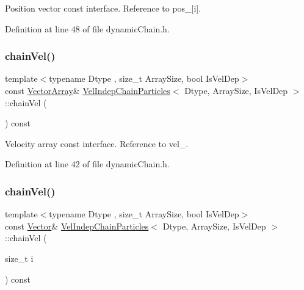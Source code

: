 Position vector const interface. Reference to pos\+\_\+\mbox{[}i\mbox{]}. 



Definition at line 48 of file dynamic\+Chain.\+h.

\mbox{\label{class_vel_indep_chain_particles_a22672cce6930aec1555f1f0662d0f52a}} 
\subsubsection{\texorpdfstring{chain\+Vel()}{chainVel()}\hspace{0.1cm}{\footnotesize\ttfamily [1/2]}}
{\footnotesize\ttfamily template$<$typename Dtype , size\+\_\+t Array\+Size, bool Is\+Vel\+Dep$>$ \\
const \mbox{\hyperlink{class_vel_indep_particles_a27580f65b6523bfb6900520af2e44708}{Vector\+Array}}\& \mbox{\hyperlink{class_vel_indep_chain_particles}{Vel\+Indep\+Chain\+Particles}}$<$ Dtype, Array\+Size, Is\+Vel\+Dep $>$\+::chain\+Vel (\begin{DoxyParamCaption}{ }\end{DoxyParamCaption}) const\hspace{0.3cm}{\ttfamily [inline]}}



Velocity array const interface. Reference to vel\+\_\+. 



Definition at line 42 of file dynamic\+Chain.\+h.

\mbox{\label{class_vel_indep_chain_particles_a81b2a3bd3f972dd11486beaafa6efc72}} 
\subsubsection{\texorpdfstring{chain\+Vel()}{chainVel()}\hspace{0.1cm}{\footnotesize\ttfamily [2/2]}}
{\footnotesize\ttfamily template$<$typename Dtype , size\+\_\+t Array\+Size, bool Is\+Vel\+Dep$>$ \\
const \mbox{\hyperlink{class_vel_indep_particles_aa7e03da81f44941c06abf43ec2180079}{Vector}}\& \mbox{\hyperlink{class_vel_indep_chain_particles}{Vel\+Indep\+Chain\+Particles}}$<$ Dtype, Array\+Size, Is\+Vel\+Dep $>$\+::chain\+Vel (\begin{DoxyParamCaption}\item[{size\+\_\+t}]{i }\end{DoxyParamCaption}) const\hspace{0.3cm}{\ttfamily [inline]}}



